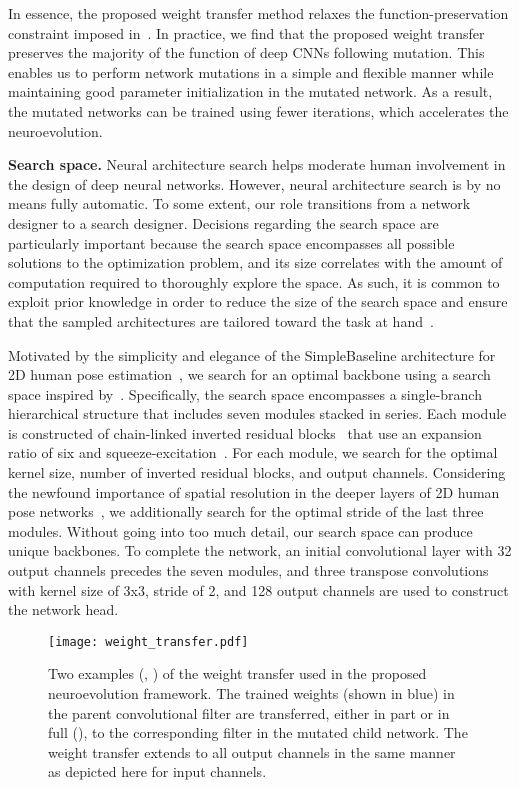 \documentclass[final]{cvpr}
\begin{document}
In essence, the proposed weight transfer method relaxes the function-preservation constraint imposed in~\cite{wei2016network, wistuba2018deep}. In practice, we find that the proposed weight transfer preserves the majority of the function of deep CNNs following mutation. This enables us to perform network mutations in a simple and flexible manner while maintaining good parameter initialization in the mutated network. As a result, the mutated networks can be trained using fewer iterations, which accelerates the neuroevolution.


\medskip\noindent\textbf{Search space.} Neural architecture search helps moderate human involvement in the design of deep neural networks. However, neural architecture search is by no means fully automatic. To some extent, our role transitions from a network designer to a search designer. Decisions regarding the search space are particularly important because the search space encompasses all possible solutions to the optimization problem, and its size correlates with the amount of computation required to thoroughly explore the space. As such, it is common to exploit prior knowledge in order to reduce the size of the search space and ensure that the sampled architectures are tailored toward the task at hand~\cite{zoph2018learning}. 

Motivated by the simplicity and elegance of the SimpleBaseline architecture for 2D human pose estimation~\cite{xiao2018simple}, we search for an optimal backbone using a search space inspired by~\cite{tan2019mnasnet, tan2019efficientnet}. Specifically, the search space encompasses a single-branch hierarchical structure that includes seven modules stacked in series. Each module is constructed of chain-linked inverted residual blocks~\cite{sandler2018mobilenetv2} that use an expansion ratio of six and squeeze-excitation~\cite{hu2018squeeze}. For each module, we search for the optimal kernel size, number of inverted residual blocks, and output channels. Considering the newfound importance of spatial resolution in the deeper layers of 2D human pose networks~\cite{sun2019deep}, we additionally search for the optimal stride of the last three modules. Without going into too much detail, our search space can produce  unique backbones. To complete the network, an initial convolutional layer with 32 output channels precedes the seven modules, and three transpose convolutions with kernel size of 3x3, stride of 2, and 128 output channels are used to construct the network head. 

\begin{figure}
\centering
    \texttt{[image: weight\_transfer.pdf]}
\caption{Two examples (, ) of the weight transfer used in the proposed neuroevolution framework. The trained weights (shown in blue) in the parent convolutional filter  are transferred, either in part or in full (), to the corresponding filter  in the mutated child network. The weight transfer extends to all output channels in the same manner as depicted here for input channels.}
\vspace{-8pt}
\label{fig:weight_transfer}
\end{figure}
\end{document}
